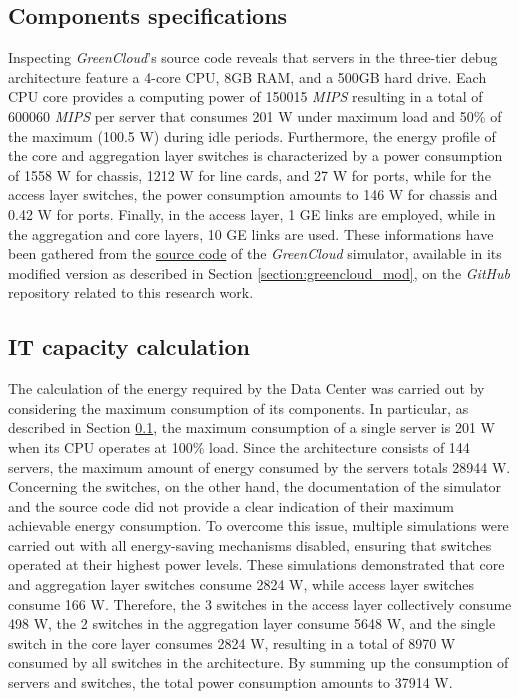 \subsection{Components specifications} \label{subsection:components_spec}
Inspecting \emph{GreenCloud}'s source code reveals that servers in the three-tier debug architecture feature a 4-core CPU, 8GB RAM, and a 500GB hard drive. Each CPU core provides a computing power of 150015 \emph{MIPS} resulting in a total of 600060 \emph{MIPS} per server that consumes 201 W under maximum load and 50\% of the maximum (100.5 W) during idle periods. Furthermore, the energy profile of the core and aggregation layer switches is characterized by a power consumption of 1558 W for chassis, 1212 W for line cards, and 27 W for ports, while for the access layer switches, the power consumption amounts to 146 W for chassis and 0.42 W for ports. Finally, in the access layer, 1 GE links are employed, while in the aggregation and core layers, 10 GE links are used. These informations have been gathered from the \href{https://github.com/vincenzo-emanuele/masters-degree-thesis/tree/main/greencloud_modified_src}{source code} of the \emph{GreenCloud} simulator, available in its modified version as described in Section \ref{section:greencloud_mod}, on the \emph{GitHub} repository related to this research work. 

\subsection{IT capacity calculation} \label{subsection:it_capacity}
The calculation of the energy required by the Data Center was carried out by considering the maximum consumption of its components. In particular, as described in Section \ref{subsection:components_spec}, the maximum consumption of a single server is 201 W when its CPU operates at 100\% load. Since the architecture consists of 144 servers, the maximum amount of energy consumed by the servers totals 28944 W. Concerning the switches, on the other hand, the documentation of the simulator and the source code did not provide a clear indication of their maximum achievable energy consumption. To overcome this issue, multiple simulations were carried out with all energy-saving mechanisms disabled, ensuring that switches operated at their highest power levels. These simulations demonstrated that core and aggregation layer switches consume 2824 W, while access layer switches consume 166 W. Therefore, the 3 switches in the access layer collectively consume 498 W, the 2 switches in the aggregation layer consume 5648 W, and the single switch in the core layer consumes 2824 W, resulting in a total of 8970 W consumed by all switches in the architecture. By summing up the consumption of servers and switches, the total power consumption amounts to 37914 W.


